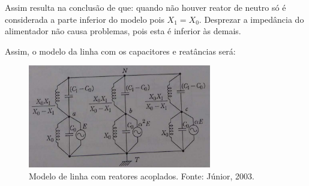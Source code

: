 Assim resulta na conclusão de que: quando não houver reator de neutro só é considerada a parte inferior do modelo pois $X_1 = X_0$. Desprezar a impedância do alimentador não causa problemas, pois esta é inferior às demais.

Assim, o modelo da linha com os capacitores e reatâncias será:

\begin{figure}[H]
\begin{center}
\includegraphics[width=8cm]{images/linha_reatores.png}
\caption{Modelo de linha com reatores acoplados. Fonte: Júnior, 2003.}
\label{fig:1} 
\end{center}
\end{figure}